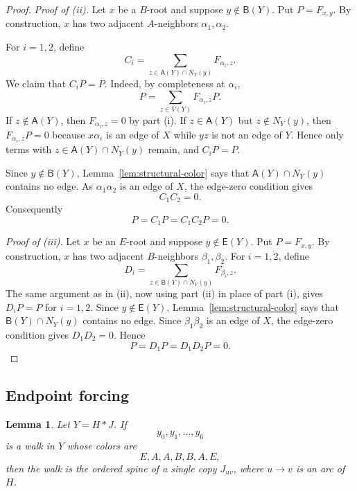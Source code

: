 \documentclass[11pt]{amsart}
\theoremstyle{plain}
\newtheorem{lemma}[theorem]{Lemma}
\theoremstyle{definition}
\newcommand{\Aset}{\mathsf A}
\newcommand{\Bset}{\mathsf B}
\newcommand{\Eset}{\mathsf E}
\begin{document}
\begin{proof}
\smallskip
\noindent\emph{Proof of (ii).}
Let $x$ be a $B$-root and suppose $y\notin \Bset(Y)$.  Put $P=F_{x,y}$.  By construction, $x$ has two adjacent $A$-neighbors $\alpha_1,\alpha_2$.

For $i=1,2$, define
\[
   C_i=\sum_{z\in \Aset(Y)\cap N_Y(y)}F_{\alpha_i,z}.
\]
We claim that $C_iP=P$.  Indeed, by completeness at $\alpha_i$,
\[
   P=\sum_{z\in V(Y)}F_{\alpha_i,z}P.
\]
If $z\notin\Aset(Y)$, then $F_{\alpha_i,z}=0$ by part (i).  If $z\in\Aset(Y)$ but $z\notin N_Y(y)$, then $F_{\alpha_i,z}P=0$ because $x\alpha_i$ is an edge of $X$ while $yz$ is not an edge of $Y$.  Hence only terms with $z\in\Aset(Y)\cap N_Y(y)$ remain, and $C_iP=P$.

Since $y\notin\Bset(Y)$, Lemma~\ref{lem:structural-color} says that $\Aset(Y)\cap N_Y(y)$ contains no edge.  As $\alpha_1\alpha_2$ is an edge of $X$, the edge-zero condition gives
\[
   C_1C_2=0.
\]
Consequently
\[
   P=C_1P=C_1C_2P=0.
\]

\smallskip
\noindent\emph{Proof of (iii).}
Let $x$ be an $E$-root and suppose $y\notin\Eset(Y)$.  Put $P=F_{x,y}$.  By construction, $x$ has two adjacent $B$-neighbors $\beta_1,\beta_2$.  For $i=1,2$, define
\[
   D_i=\sum_{z\in \Bset(Y)\cap N_Y(y)}F_{\beta_i,z}.
\]
The same argument as in (ii), now using part (ii) in place of part (i), gives $D_iP=P$ for $i=1,2$.  Since $y\notin\Eset(Y)$, Lemma~\ref{lem:structural-color} says that $\Bset(Y)\cap N_Y(y)$ contains no edge.  Since $\beta_1\beta_2$ is an edge of $X$, the edge-zero condition gives $D_1D_2=0$.  Hence
\[
   P=D_1P=D_1D_2P=0.
\]
\end{proof}

\subsection{Endpoint forcing}

\begin{lemma}\label{lem:colored-spine}
Let $Y=H*J$.  If
\[
   y_0,y_1,\ldots,y_6
\]
is a walk in $Y$ whose colors are
\[
   E,A,A,B,B,A,E,
\]
then the walk is the ordered spine of a single copy $J_{uv}$, where $u\to v$ is an arc of $H$.
\end{lemma}
\end{document}
